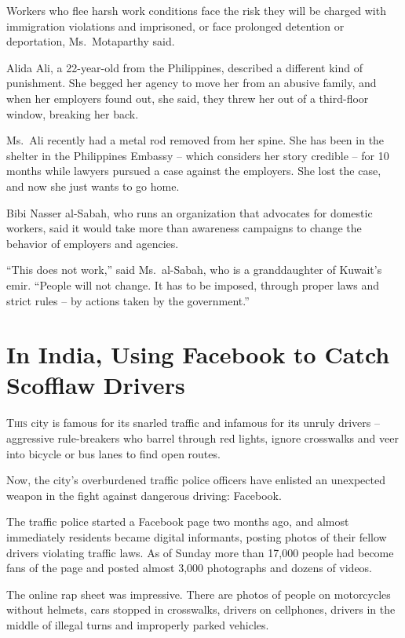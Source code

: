 ﻿\documentclass[12pt]{article}
\begin{document}
Workers who flee harsh work conditions face the risk they will be charged with immigration
violations and imprisoned, or face prolonged detention or deportation, Ms.~Motaparthy said.

Alida Ali, a 22-year-old from the Philippines, described a different kind of punishment. She begged
her agency to move her from an abusive family, and when her employers found out, she said, they
threw her out of a third-floor window, breaking her back.

Ms.~Ali recently had a metal rod removed from her spine. She has been in the shelter in the
Philippines Embassy -- which considers her story credible -- for 10 months while lawyers pursued a
case against the employers. She lost the case, and now she just wants to go home.

Bibi Nasser al-Sabah, who runs an organization that advocates for domestic workers, said it would
take more than awareness campaigns to change the behavior of employers and agencies.

``This does not work,'' said Ms.~al-Sabah, who is a granddaughter of Kuwait's emir. ``People will
not change. It has to be imposed, through proper laws and strict rules -- by actions taken by the
government.''

\section{In India, Using Facebook to Catch Scofflaw Drivers}

\lettrine{T}{his} city is famous for its snarled traffic and infamous for
its unruly drivers -- aggressive rule-breakers who barrel through red lights, ignore crosswalks and
veer into bicycle or bus lanes to find open routes.

Now, the city's overburdened traffic police officers have enlisted an unexpected weapon in the fight
against dangerous driving: Facebook.

The traffic police started a Facebook page two months ago, and almost immediately residents became
digital informants, posting photos of their fellow drivers violating traffic laws. As of Sunday more
than 17,000 people had become fans of the page and posted almost 3,000 photographs and dozens of
videos.

The online rap sheet was impressive. There are photos of people on motorcycles without helmets, cars
stopped in crosswalks, drivers on cellphones, drivers in the middle of illegal turns and improperly
parked vehicles.
\end{document}
